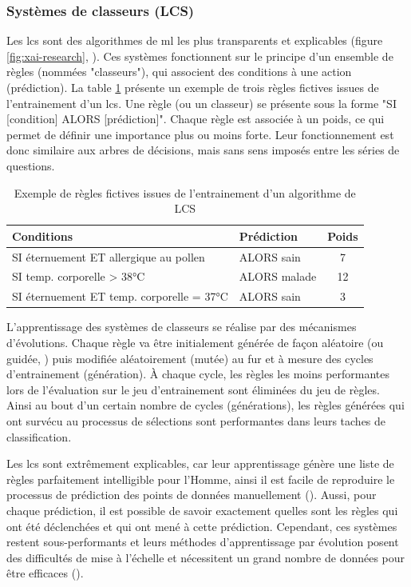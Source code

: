 \subsubsection{Systèmes de classeurs (LCS)}
Les \gls{lcs} sont des algorithmes de \gls{ml} les plus transparents et explicables (figure \ref{fig:xai-research}, \cite{arrieta_explainable_2019}). Ces systèmes fonctionnent sur le principe d'un ensemble de règles (nommées "classeurs"), qui associent des conditions à une action (prédiction). La table \ref{table:lcs-rules} présente un exemple de trois règles fictives issues de l'entrainement d'un \gls{lcs}. Une règle (ou un classeur) se présente sous la forme "SI [condition] ALORS [prédiction]". Chaque règle est associée à un poids, ce qui permet de définir une importance plus ou moins forte. Leur fonctionnement est donc similaire aux arbres de décisions, mais sans sens imposés entre les séries de questions.
\begin{table}[!ht]
\centering
\begin{tabular}{|l|l|c|} 
 \hline
 Conditions & Prédiction & Poids \\
 \hline
 SI éternuement ET allergique au pollen & ALORS sain & 7 \\ 
 SI temp. corporelle > 38°C & ALORS malade & 12  \\ 
 SI éternuement ET temp. corporelle = 37°C & ALORS sain & 3  \\ 

 \hline
\end{tabular}
\caption{Exemple de règles fictives issues de l'entrainement d'un algorithme de LCS}
\label{table:lcs-rules}
\end{table}

L'apprentissage des systèmes de classeurs se réalise par des mécanismes d'évolutions. Chaque règle va être initialement générée de façon aléatoire (ou guidée, \cite{urbanowicz_relief-based_2018}) puis modifiée aléatoirement (mutée) au fur et à mesure des cycles d'entrainement (génération). À chaque cycle, les règles les moins performantes lors de l'évaluation sur le jeu d'entrainement sont éliminées du jeu de règles. Ainsi au bout d'un certain nombre de cycles (générations), les règles générées qui ont survécu au processus de sélections sont performantes dans leurs taches de classification.

Les \gls{lcs} sont extrêmement explicables, car leur apprentissage génère une liste de règles parfaitement intelligible pour l'Homme, ainsi il est facile de reproduire le processus de prédiction des points de données manuellement (\cite{arrieta_explainable_2019}). Aussi, pour chaque prédiction, il est possible de savoir exactement quelles sont les règles qui ont été déclenchées et qui ont mené à cette prédiction. Cependant, ces systèmes restent sous-performants et leurs méthodes d'apprentissage par évolution posent des difficultés de mise à l'échelle et nécessitent un grand nombre de données pour être efficaces (\cite{urbanowicz_exstracs_2015}).

